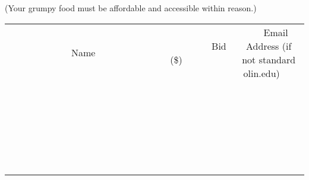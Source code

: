 \documentclass[11pt]{article}
\begin{document}
(Your grumpy food must be affordable and accessible within reason.)
\\[6ex]
\begin{tabular}{c c c}
~~~~~~~~~~~~~Name~~~~~~~~~~~~~ & ~~~~~~~~~Bid (\$)~~~~~~~~~  & ~~~Email Address (if not standard olin.edu)~~~\\
 & & \\
\hline
 & & \\
\hline
 & & \\
\hline
 & & \\
\hline
 & & \\
\hline
 & & \\
\hline
 & & \\
\hline
 & & \\
\hline
 & & \\
\hline
 & & \\
\hline
 & & \\
\hline
 & & \\
\hline
 & & \\
\hline
 & & \\
\hline
 & & \\
\hline
 & & \\
\hline
 & & \\
\hline
 & & \\
\hline
 & & \\
\hline
 & & \\
\hline
 & & \\
\hline
 & & \\
\hline
 & & \\
\hline
 & & \\
\hline
 & & \\
\hline
 & & \\
\hline
\end{tabular}
\newpage
\end{document}
